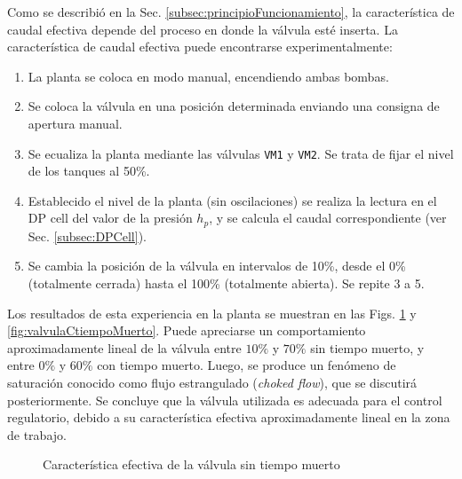 Como se describió en la Sec. \ref{subsec:principioFuncionamiento}, la
característica de caudal efectiva depende del proceso en donde la válvula esté
inserta. La característica de caudal efectiva puede encontrarse
experimentalmente:
\begin{enumerate}
 \item La planta se coloca en modo manual, encendiendo ambas bombas.
 \item Se coloca la válvula en una posición determinada enviando una consigna
de apertura manual.
 \item Se ecualiza la planta mediante las válvulas \verb|VM1| y \verb|VM2|. Se
trata de fijar el nivel de los tanques al 50\%.
 \item Establecido el nivel de la planta (sin oscilaciones) se realiza la
lectura en el DP cell del valor de la presión $h_p$,
y se calcula el caudal correspondiente (ver Sec. \ref{subsec:DPCell}).
 \item Se cambia la posición de la válvula en intervalos de
 10\%, desde el 0\% (totalmente cerrada) hasta el 100\% (totalmente abierta).
Se repite 3 a 5.
\end{enumerate}

Los resultados de esta experiencia en la planta se muestran en las Figs.
\ref{fig:valvulaStiempoMuerto} y \ref{fig:valvulaCtiempoMuerto}.
Puede apreciarse un comportamiento aproximadamente lineal de la válvula entre
$10\%$ y $70\%$ sin tiempo muerto, y entre $0\%$ y $60\%$ con tiempo muerto.
Luego, se produce un fenómeno de saturación conocido como flujo
estrangulado (\emph{choked flow}), que se discutirá posteriormente.
Se concluye que la válvula utilizada es adecuada para el
control regulatorio, debido a su característica efectiva aproximadamente lineal
en la zona de trabajo.

\begin{figure}[ht]
  \centering
\caption{Característica efectiva de la válvula sin tiempo muerto}
\label{fig:valvulaStiempoMuerto}
\end{figure}

